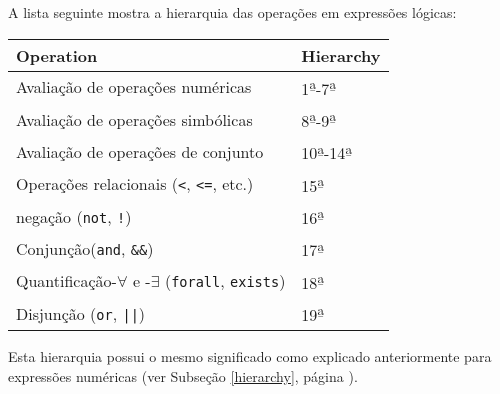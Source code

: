 \documentclass[11pt, brazil]{report}
\begin{document}
A lista seguinte mostra a hierarquia das operações em expressões
lógicas:


\noindent\hfil
\begin{tabular}{@{}ll@{}}
Operation&Hierarchy\\
\hline
Avaliação de operações numéricas&
1{\textsuperscript{\b{a}}}-7{\textsuperscript{\b{a}}}\\
Avaliação de operações simbólicas&
8{\textsuperscript{\b{a}}}-9{\textsuperscript{\b{a}}}\\
Avaliação de operações de conjunto&
10{\textsuperscript{\b{a}}}-14{\textsuperscript{\b{a}}}\\
Operações relacionais ({\tt<}, {\tt<=}, etc.)&
15{\textsuperscript{\b{a}}}\\
negação ({\tt not}, {\tt!})&
16{\textsuperscript{\b{a}}}\\
Conjunção({\tt and}, {\tt\&\&})&
17{\textsuperscript{\b{a}}}\\
Quantificação-$\forall$ e -$\exists$ ({\tt forall}, {\tt exists})&
18{\textsuperscript{\b{a}}}\\
Disjunção ({\tt or}, {\tt||})&
19{\textsuperscript{\b{a}}}\\
\end{tabular}


Esta hierarquia possui o mesmo significado como explicado anteriormente
para expressões \linebreak numéricas (ver Subseção \ref{hierarchy}, página \pageref{hierarchy}).
\end{document}
